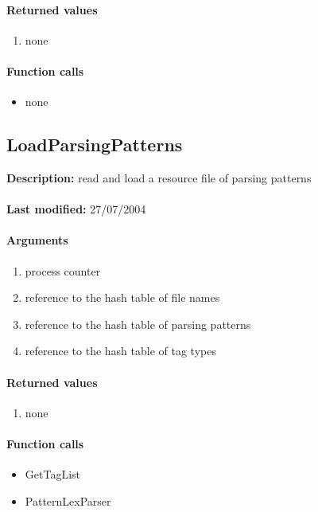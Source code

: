 \paragraph{Returned values}
\begin{enumerate}
\item none
\end{enumerate}

\paragraph{Function calls}
\begin{itemize}
\item none
\end{itemize}

\subsection{LoadParsingPatterns}
\textbf{Description:} read and load a resource file of parsing patterns\\
\\\textbf{Last modified:} 27/07/2004

\paragraph{Arguments}
\begin{enumerate}
\item process counter
\item reference to the hash table of file names
\item reference to the hash table of parsing patterns
\item reference to the hash table of tag types
\end{enumerate}

\paragraph{Returned values}
\begin{enumerate}
\item none
\end{enumerate}

\paragraph{Function calls}
\begin{itemize}
\item GetTagList
\item PatternLexParser
\end{itemize}

